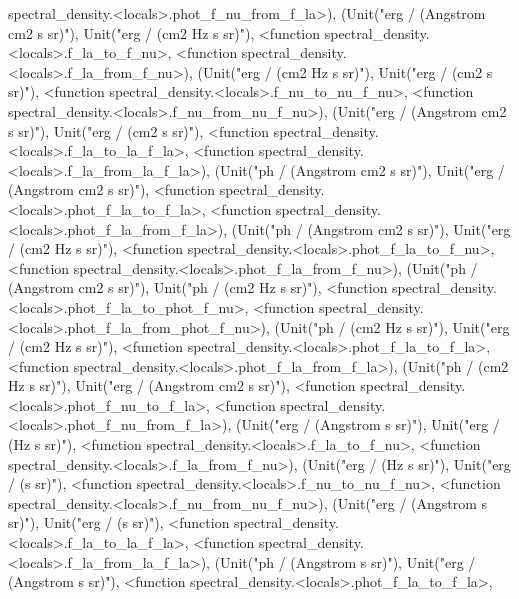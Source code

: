 \documentclass[letterpaper,10pt,english]{sphinxmanual}
\begin{document}
\begin{fulllineitems}
spectral\_density.\textless{}locals\textgreater{}.phot\_f\_nu\_from\_f\_la\textgreater{}), (Unit("erg / (Angstrom cm2 s sr)"), Unit("erg / (cm2 Hz s sr)"), \textless{}function spectral\_density.\textless{}locals\textgreater{}.f\_la\_to\_f\_nu\textgreater{}, \textless{}function spectral\_density.\textless{}locals\textgreater{}.f\_la\_from\_f\_nu\textgreater{}), (Unit("erg / (cm2 Hz s sr)"), Unit("erg / (cm2 s sr)"), \textless{}function spectral\_density.\textless{}locals\textgreater{}.f\_nu\_to\_nu\_f\_nu\textgreater{}, \textless{}function spectral\_density.\textless{}locals\textgreater{}.f\_nu\_from\_nu\_f\_nu\textgreater{}), (Unit("erg / (Angstrom cm2 s sr)"), Unit("erg / (cm2 s sr)"), \textless{}function spectral\_density.\textless{}locals\textgreater{}.f\_la\_to\_la\_f\_la\textgreater{}, \textless{}function spectral\_density.\textless{}locals\textgreater{}.f\_la\_from\_la\_f\_la\textgreater{}), (Unit("ph / (Angstrom cm2 s sr)"), Unit("erg / (Angstrom cm2 s sr)"), \textless{}function spectral\_density.\textless{}locals\textgreater{}.phot\_f\_la\_to\_f\_la\textgreater{}, \textless{}function spectral\_density.\textless{}locals\textgreater{}.phot\_f\_la\_from\_f\_la\textgreater{}), (Unit("ph / (Angstrom cm2 s sr)"), Unit("erg / (cm2 Hz s sr)"), \textless{}function spectral\_density.\textless{}locals\textgreater{}.phot\_f\_la\_to\_f\_nu\textgreater{}, \textless{}function spectral\_density.\textless{}locals\textgreater{}.phot\_f\_la\_from\_f\_nu\textgreater{}), (Unit("ph / (Angstrom cm2 s sr)"), Unit("ph / (cm2 Hz s sr)"), \textless{}function spectral\_density.\textless{}locals\textgreater{}.phot\_f\_la\_to\_phot\_f\_nu\textgreater{}, \textless{}function spectral\_density.\textless{}locals\textgreater{}.phot\_f\_la\_from\_phot\_f\_nu\textgreater{}), (Unit("ph / (cm2 Hz s sr)"), Unit("erg / (cm2 Hz s sr)"), \textless{}function spectral\_density.\textless{}locals\textgreater{}.phot\_f\_la\_to\_f\_la\textgreater{}, \textless{}function spectral\_density.\textless{}locals\textgreater{}.phot\_f\_la\_from\_f\_la\textgreater{}), (Unit("ph / (cm2 Hz s sr)"), Unit("erg / (Angstrom cm2 s sr)"), \textless{}function spectral\_density.\textless{}locals\textgreater{}.phot\_f\_nu\_to\_f\_la\textgreater{}, \textless{}function spectral\_density.\textless{}locals\textgreater{}.phot\_f\_nu\_from\_f\_la\textgreater{}), (Unit("erg / (Angstrom s sr)"), Unit("erg / (Hz s sr)"), \textless{}function spectral\_density.\textless{}locals\textgreater{}.f\_la\_to\_f\_nu\textgreater{}, \textless{}function spectral\_density.\textless{}locals\textgreater{}.f\_la\_from\_f\_nu\textgreater{}), (Unit("erg / (Hz s sr)"), Unit("erg / (s sr)"), \textless{}function spectral\_density.\textless{}locals\textgreater{}.f\_nu\_to\_nu\_f\_nu\textgreater{}, \textless{}function spectral\_density.\textless{}locals\textgreater{}.f\_nu\_from\_nu\_f\_nu\textgreater{}), (Unit("erg / (Angstrom s sr)"), Unit("erg / (s sr)"), \textless{}function spectral\_density.\textless{}locals\textgreater{}.f\_la\_to\_la\_f\_la\textgreater{}, \textless{}function spectral\_density.\textless{}locals\textgreater{}.f\_la\_from\_la\_f\_la\textgreater{}), (Unit("ph / (Angstrom s sr)"), Unit("erg / (Angstrom s sr)"), \textless{}function spectral\_density.\textless{}locals\textgreater{}.phot\_f\_la\_to\_f\_la\textgreater{}, 
\end{fulllineitems}
\end{document}

